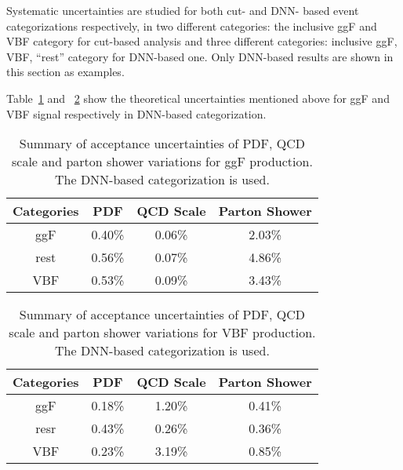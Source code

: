 Systematic uncertainties are studied for both cut- and DNN- based event categorizations respectively, 
in two different categories: the inclusive ggF and VBF category for cut-based analysis and three different categories: inclusive ggF, VBF, ``rest'' category for DNN-based one.
Only DNN-based results are shown in this section as examples.

Table~\ref{tab:acc-ggF-dnn} and ~\ref{tab:acc-VBF-dnn} show the theoretical uncertainties mentioned above for ggF and VBF signal respectively in DNN-based categorization.

\begin{table}[htbp]
  \centering
  \caption{Summary of acceptance uncertainties of PDF, QCD scale and parton shower variations for ggF production. The DNN-based categorization is used.}
  \label{tab:acc-ggF-dnn}
  \begin{tabular}{cccc}
    \toprule
    Categories  & PDF    & QCD Scale  & Parton Shower \\
    \midrule
    ggF  & 0.40\% & 0.06\% & 2.03\% \\
    rest & 0.56\% & 0.07\% & 4.86\% \\
    VBF  & 0.53\% & 0.09\% & 3.43\% \\
    \bottomrule
  \end{tabular}
\end{table}

\begin{table}[htbp]
  \centering
  \caption{Summary of acceptance uncertainties of PDF, QCD scale and parton shower variations for VBF production. The DNN-based categorization is used.}
  \label{tab:acc-VBF-dnn}
  \begin{tabular}{cccc}
    \toprule
    Categories  & PDF    & QCD Scale  & Parton Shower \\
    \midrule
    ggF  & 0.18\% & 1.20\% & 0.41\% \\
    resr & 0.43\% & 0.26\% & 0.36\% \\
    VBF  & 0.23\% & 3.19\% & 0.85\% \\
    \bottomrule
  \end{tabular}
\end{table}

